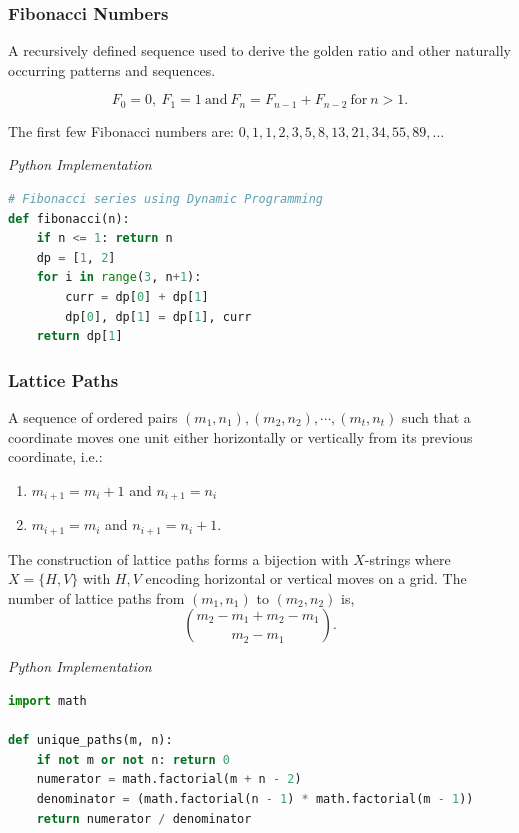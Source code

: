 \documentclass{article}
\begin{document}
    \subsubsection{Fibonacci Numbers}
    A recursively defined sequence used to derive the golden ratio and other naturally occurring patterns and sequences.
    
    \[
         F_{0}=0, \ F_{1}=1 \ \text{and} \ 
        F_{n}=F_{n-1}+F_{n-2} \ \text{for}  \ n > 1.
    \]
    
    The first few Fibonacci numbers are: $0, 1, 1, 2, 3, 5, 8, 13, 21, 34, 55, 89, \dots$
    
\vspace{8pt} \emph{Python Implementation}
\begin{lstlisting}[language=Python]
# Fibonacci series using Dynamic Programming  
def fibonacci(n):
    if n <= 1: return n
    dp = [1, 2]
    for i in range(3, n+1):
        curr = dp[0] + dp[1]
        dp[0], dp[1] = dp[1], curr
    return dp[1]
\end{lstlisting}

    \subsubsection{Lattice Paths}

    A sequence of ordered pairs $(m_1, n_1), (m_2, n_2), \cdots, (m_t, n_t)$ such that a coordinate moves one unit either horizontally or vertically from its previous coordinate, i.e.:
    \begin{enumerate}
        \item $m_{i+1} = m_{i}+1$ and $n_{i+1} = n_{i}$
        \item $m_{i+1} = m_i$ and $n_{i+1} = n_i +1$.
    \end{enumerate}
    The construction of lattice paths forms a bijection with $X$-strings where $X = \{ H, V\}$ with $H,V$ encoding horizontal or vertical moves on a grid. The number of lattice paths from $(m_1, n_1)$ to $(m_2,n_2)$ is,
    \[
       \binom{m_2 - m_1 + m_2 - m_1}{m_2-m_1}.
    \]

\vspace{8pt} \emph{Python Implementation}
\begin{lstlisting}[language=Python]
import math

def unique_paths(m, n):
    if not m or not n: return 0
    numerator = math.factorial(m + n - 2)
    denominator = (math.factorial(n - 1) * math.factorial(m - 1))
    return numerator / denominator
\end{lstlisting}
\end{document}
